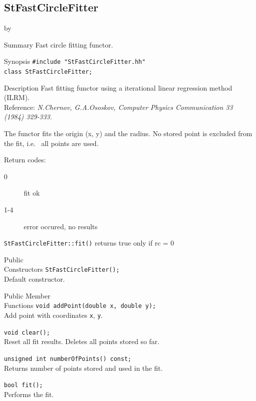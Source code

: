 \documentclass[twoside]{article}
\newcommand{\entrylabel}[1]{\mbox{\textbf{{#1}}}\hfil}%
\newenvironment{entry}
{\begin{list}{}%
    {\renewcommand{\makelabel}{\entrylabel}%
     \setlength{\labelwidth}{90pt}%
     \setlength{\leftmargin}{\labelwidth}
     \advance\leftmargin by \labelsep%
      }%
    }%
  {\end{list}}
\newcommand{\Entrylabel}[1]%
{\raisebox{0pt}[1ex][0pt]{\makebox[\labelwidth][l]%
    {\parbox[t]{\labelwidth}{\hspace{0pt}\textbf{{#1}}}}}}
\newenvironment{Entry}%
{\renewcommand{\entrylabel}{\Entrylabel}\begin{entry}}%
  {\end{entry}}
\begin{document}
\subsection{StFastCircleFitter }
\label{StFastCircleFitter}
\begin{Entry}
\item[Summary]
     Fast circle fitting functor.
     
\item[Synopsis]
  \verb+#include "StFastCircleFitter.hh"+ \\
  \verb+class StFastCircleFitter;+
  
    
\item[Description]   
  Fast fitting functor using a iterational linear regression 
  method (ILRM).\\
  Reference: \textit{N.Chernov, G.A.Ososkov, Computer  
  Physics Communication 33 (1984) 329-333.}              

  The functor fits the origin (x, y) and the radius. No stored
  point is excluded from the fit, i.e.~ all points are used.
  
  Return codes:
  \begin{description}
      \item[0]    fit ok 
      \item[1-4]  error occured, no results
  \end{description}
  \texttt{StFastCircleFitter::fit()} returns true only if rc = 0

\item[Public\\ Constructors]
    \verb+StFastCircleFitter();+\\
    Default constructor. 
    
\item[Public Member\\ Functions]
    \verb+void addPoint(double x, double y);+\\
    Add point with coordinates \texttt{x}, \texttt{y}.

    \verb+void clear();+\\
    Reset all fit results. Deletes all points stored so far.

    \verb+unsigned int numberOfPoints() const;+\\
    Returns number of points stored and used in the fit.
    
    \verb+bool fit();+\\
    Performs the fit.
    

\end{Entry}
\end{document}
